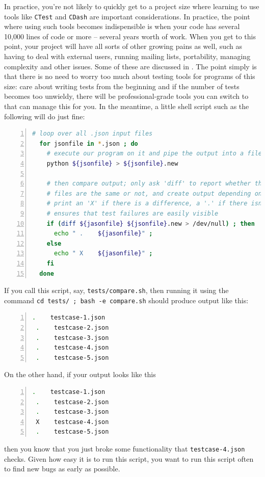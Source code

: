 \documentclass{article}
\begin{document}
In practice, you're not likely to quickly get to a project size where learning
to use tools like \texttt{CTest} and \texttt{CDash} are important
considerations. In practice, the point where using such tools becomes
indispensible is when your code has several 10,000 lines of code or more --
several years worth of work. When you get to this point, your project will
have all sorts of other growing pains as well, such as having to deal with
external users, running mailing lists, portability, managing complexity and
other issues. Some of these are discussed in \cite{BH13}. The point simply is
that there is no need to worry too much about testing tools for programs of
this size: care about writing tests from the beginning and if the number of
tests becomes too unwieldy, there will be professional-grade tools you can
switch to that can manage this for you. In the meantime, a little shell script
such as the following will do just fine:
\begin{lstlisting}[frame=single,basicstyle=\footnotesize,numbers=left,language=bash]
  # loop over all .json input files
  for jsonfile in *.json ; do
    # execute our program on it and pipe the output into a file
    python ${jsonfile} > ${jsonfile}.new

    # then compare output; only ask 'diff' to report whether the
    # files are the same or not, and create output depending on this:
    # print an 'X' if there is a difference, a '.' if there isn't. this
    # ensures that test failures are easily visible
    if (diff ${jasonfile} ${jsonfile}.new > /dev/null) ; then
      echo " .    ${jasonfile}" ;
    else 
      echo " X    ${jasonfile}" ;
    fi
  done
\end{lstlisting}
If you call this script, say, \texttt{tests/compare.sh}, then running it using
the command \texttt{cd tests/ ; bash -e compare.sh} should produce output like
this:
\begin{lstlisting}[frame=single,basicstyle=\footnotesize,numbers=left,language=bash]
 .    testcase-1.json
 .    testcase-2.json
 .    testcase-3.json
 .    testcase-4.json
 .    testcase-5.json
\end{lstlisting}
On the other hand, if your output looks like this
\begin{lstlisting}[frame=single,basicstyle=\footnotesize,numbers=left,language=bash]
 .    testcase-1.json
 .    testcase-2.json
 .    testcase-3.json
 X    testcase-4.json
 .    testcase-5.json
\end{lstlisting}
then you know that you just broke some functionality that
\texttt{testcase-4.json} checks. Given how easy it is to run this script, you
want to run this script often to find new bugs as early as possible.
\end{document}
